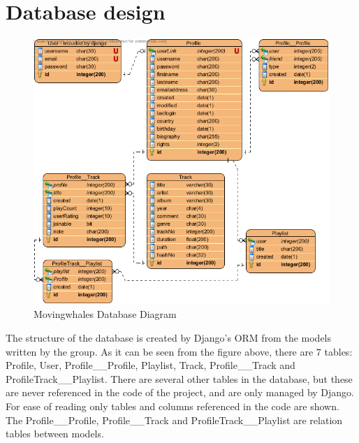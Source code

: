 \section{Database design}
\begin{figure}[h!]
\centering
\includegraphics[scale=0.5]{design/figures/mwdbdiagram}
\caption{Movingwhales Database Diagram}
\end{figure}
The structure of the database is created by Django's ORM from the models written by the group. As it can be seen from the figure above, there
are 7 tables: Profile, User, Profile\_\_Profile, Playlist, Track, Profile\_\_Track and 
ProfileTrack\_\_Playlist. There are several other tables in the database, but these are never referenced in the code of the 
project, and are only managed by Django. For ease of reading only tables and columns referenced in the code are shown. The 
Profile\_\_Profile, Profile\_\_Track and ProfileTrack\_\_Playlist are relation tables between models.
